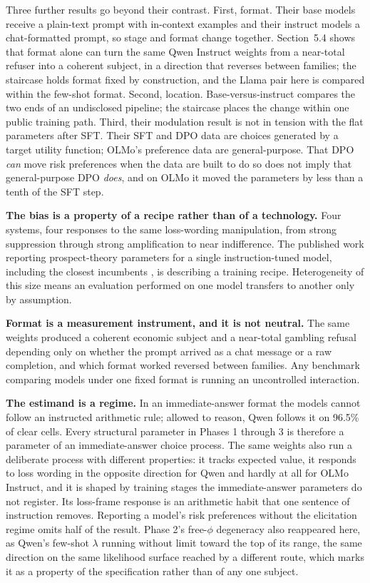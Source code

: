 \documentclass[11pt]{article}
\begin{document}
Three further results go beyond their contrast. First, format. Their base models receive a plain-text
prompt with in-context examples and their instruct models a chat-formatted prompt, so stage and format
change together. Section~5.4 shows that format alone can turn the same Qwen Instruct weights from a
near-total refuser into a coherent subject, in a direction that reverses between families; the
staircase holds format fixed by construction, and the Llama pair here is compared within the few-shot
format. Second, location. Base-versus-instruct compares the two ends of an undisclosed pipeline; the
staircase places the change within one public training path. Third, their modulation result is not in
tension with the flat parameters after SFT. Their SFT and DPO data are choices generated by a target
utility function; OLMo's preference data are general-purpose. That DPO \emph{can} move risk preferences
when the data are built to do so does not imply that general-purpose DPO \emph{does}, and on OLMo it
moved the parameters by less than a tenth of the SFT step.

\textbf{The bias is a property of a recipe rather than of a technology.} Four systems, four responses to
the same loss-wording manipulation, from strong suppression through strong amplification to near
indifference. The published work reporting prospect-theory parameters for a single instruction-tuned
model, including the closest incumbents \citep{liu2025,cpt2025}, is describing a training
recipe. Heterogeneity of this size means an evaluation performed on one model transfers to another only
by assumption.

\textbf{Format is a measurement instrument, and it is not neutral.} The same weights produced a coherent
economic subject and a near-total gambling refusal depending only on whether the prompt arrived as a
chat message or a raw completion, and which format worked reversed between families. Any benchmark
comparing models under one fixed format is running an uncontrolled interaction.

\textbf{The estimand is a regime.} In an immediate-answer format the models cannot follow an instructed
arithmetic rule; allowed to reason, Qwen follows it on 96.5\% of clear cells. Every structural parameter
in Phases 1 through 3 is therefore a parameter of an immediate-answer choice process. The same weights
also run a deliberate process with different properties: it tracks expected value, it responds to loss
wording in the opposite direction for Qwen and hardly at all for OLMo Instruct, and it is shaped by
training stages the immediate-answer parameters do not register. Its loss-frame response is an
arithmetic habit that one sentence of instruction removes. Reporting a model's risk preferences without
the elicitation regime omits half of the result. Phase 2's free-$\phi$ degeneracy also reappeared here, as Qwen's few-shot
$\lambda$ running without limit toward the top of its range, the same direction on the same likelihood
surface reached by a different route, which marks it as a property of the specification rather than of
any one subject.
\end{document}
